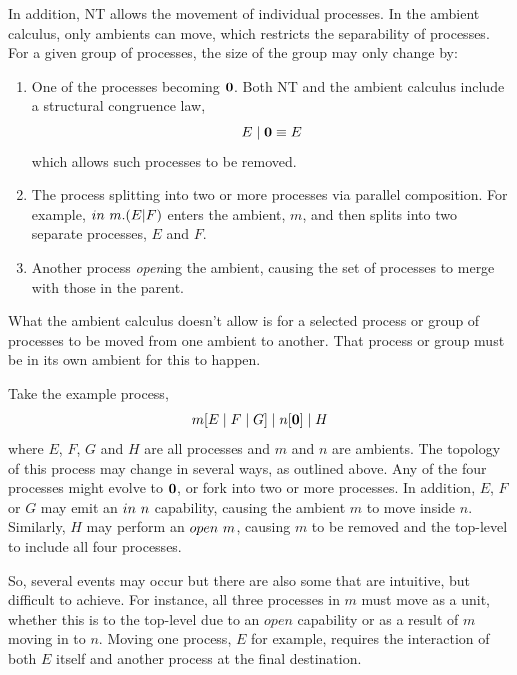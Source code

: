 In addition, NT allows the movement of individual processes.  In the
ambient calculus, only ambients can move, which restricts the
separability of processes.  For a given group of processes, the
size of the group may only change by:

\begin{enumerate}
\item One of the processes becoming $\textbf{0}$.  Both NT and the ambient
      calculus include a structural congruence law,
\begin{equation}
E\;|\;\textbf{0} \equiv E
\end{equation}
      which allows such processes to be removed.
\item The process splitting into two or more processes via parallel
      composition.  For example, $in\ m.(E | F)$ enters the ambient, $m$,
      and then splits into two separate processes, $E$ and $F$.
\item Another process \emph{open}ing the ambient, causing the set of
      processes to merge with those in the parent.
\end{enumerate}

What the ambient calculus doesn't allow is for a selected process or
group of processes to be moved from one ambient to another.  That
process or group must be in its own ambient for this to happen.

Take the example process, 
\begin{equation}
m[E\;|\;F\;|\;G]\;|\;n[\textbf{0}]\;|\;H
\end{equation}
where $E$, $F$, $G$ and $H$ are all processes and $m$ and $n$
are ambients.  The topology of this process may change in several ways, as
outlined above. Any of the four processes might evolve to $\textbf{0}$, or fork
into two or more processes.  In addition, $E$, $F$ or $G$ may emit an
$in\ n$ capability, causing the ambient $m$ to move inside $n$.
Similarly, $H$ may perform an $open\ m$, causing $m$ to be removed and
the top-level to include all four processes.

So, several events may occur but there are also some that are intuitive,
but difficult to achieve.  For instance, all three processes in $m$ must
move as a unit, whether this is to the top-level due to an $open$
capability or as a result of $m$ moving in to $n$.  Moving one process,
$E$ for example, requires the interaction of both $E$ itself and another
process at the final destination.

